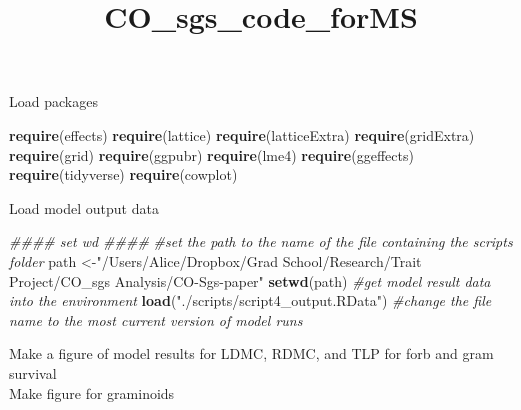 \documentclass[
]{article}
\title{CO\_sgs\_code\_forMS}
\author{}
\date{\vspace{-2.5em}}
\newenvironment{Shaded}{\begin{snugshade}}{\end{snugshade}}
\newcommand{\CommentTok}[1]{\textcolor[rgb]{0.56,0.35,0.01}{\textit{#1}}}
\newcommand{\KeywordTok}[1]{\textcolor[rgb]{0.13,0.29,0.53}{\textbf{#1}}}
\newcommand{\NormalTok}[1]{#1}
\newcommand{\StringTok}[1]{\textcolor[rgb]{0.31,0.60,0.02}{#1}}
\begin{document}
\maketitle

Load packages

\begin{Shaded}
\begin{Highlighting}[]
\KeywordTok{require}\NormalTok{(effects)}
\KeywordTok{require}\NormalTok{(lattice)}
\KeywordTok{require}\NormalTok{(latticeExtra)}
\KeywordTok{require}\NormalTok{(gridExtra)}
\KeywordTok{require}\NormalTok{(grid)}
\KeywordTok{require}\NormalTok{(ggpubr)}
\KeywordTok{require}\NormalTok{(lme4)}
\KeywordTok{require}\NormalTok{(ggeffects)}
\KeywordTok{require}\NormalTok{(tidyverse)}
\KeywordTok{require}\NormalTok{(cowplot)}
\end{Highlighting}
\end{Shaded}

Load model output data

\begin{Shaded}
\begin{Highlighting}[]
\CommentTok{\#\#\#\# set wd \#\#\#\#}
\CommentTok{\#set the path to the name of the file containing the \textquotesingle{}scripts\textquotesingle{} folder}
\NormalTok{path \textless{}{-}}\StringTok{"/Users/Alice/Dropbox/Grad School/Research/Trait Project/CO\_sgs Analysis/CO{-}Sgs{-}paper"}
\KeywordTok{setwd}\NormalTok{(path)}
\CommentTok{\#get model result data into the environment}
\KeywordTok{load}\NormalTok{(}\StringTok{"./scripts/script4\_output.RData"}\NormalTok{) }\CommentTok{\#change the file name to the most current version of model runs}
\end{Highlighting}
\end{Shaded}

Make a figure of model results for LDMC, RDMC, and TLP for forb and gram
survival\\
Make figure for graminoids
\end{document}
